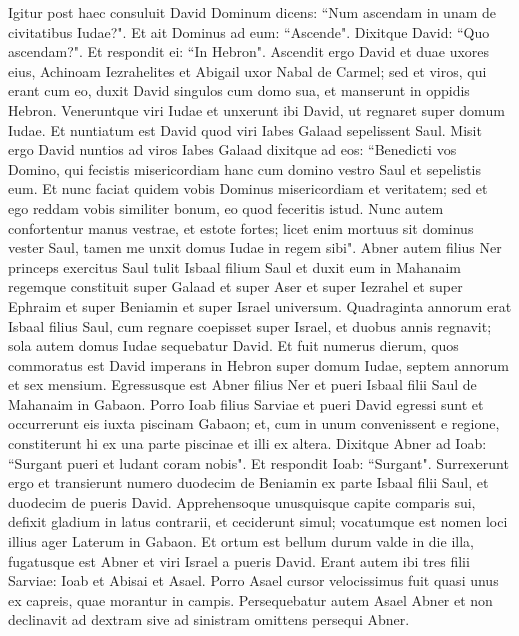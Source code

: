 \begin{biblechapter}  
\verse Igitur post haec consuluit David Dominum dicens: “Num ascendam in unam de civitatibus Iudae?". Et ait Dominus ad eum: “Ascende". Dixitque David: “Quo ascendam?". Et respondit ei: “In Hebron". 
\verse Ascendit ergo David et duae uxores eius, Achinoam Iezrahelites et Abigail uxor Nabal de Carmel; 
\verse sed et viros, qui erant cum eo, duxit David singulos cum domo sua, et manserunt in oppidis Hebron. 
\verse Veneruntque viri Iudae et unxerunt ibi David, ut regnaret super domum Iudae. Et nuntiatum est David quod viri Iabes Galaad sepelissent Saul. 
\verse Misit ergo David nuntios ad viros Iabes Galaad dixitque ad eos: “Benedicti vos Domino, qui fecistis misericordiam hanc cum domino vestro Saul et sepelistis eum. 
\verse Et nunc faciat quidem vobis Dominus misericordiam et veritatem; sed et ego reddam vobis similiter bonum, eo quod feceritis istud. 
\verse Nunc autem confortentur manus vestrae, et estote fortes; licet enim mortuus sit dominus vester Saul, tamen me unxit domus Iudae in regem sibi". 
\verse Abner autem filius Ner princeps exercitus Saul tulit Isbaal filium Saul et duxit eum in Mahanaim 
\verse regemque constituit super Galaad et super Aser et super Iezrahel et super Ephraim et super Beniamin et super Israel universum.  
\verse Quadraginta annorum erat Isbaal filius Saul, cum regnare coepisset super Israel, et duobus annis regnavit; sola autem domus Iudae sequebatur David.  
\verse Et fuit numerus dierum, quos commoratus est David imperans in Hebron super domum Iudae, septem annorum et sex mensium. 
\verse Egressusque est Abner filius Ner et pueri Isbaal filii Saul de Mahanaim in Gabaon. 
\verse Porro Ioab filius Sarviae et pueri David egressi sunt et occurrerunt eis iuxta piscinam Gabaon; et, cum in unum convenissent e regione, constiterunt hi ex una parte piscinae et illi ex altera. 
\verse Dixitque Abner ad Ioab: “Surgant pueri et ludant coram nobis". Et respondit Ioab: “Surgant". 
\verse Surrexerunt ergo et transierunt numero duodecim de Beniamin ex parte Isbaal filii Saul, et duodecim de pueris David. 
\verse Apprehensoque unusquisque capite comparis sui, defixit gladium in latus contrarii, et ceciderunt simul; vocatumque est nomen loci illius ager Laterum in Gabaon. 
\verse Et ortum est bellum durum valde in die illa, fugatusque est Abner et viri Israel a pueris David. 
\verse Erant autem ibi tres filii Sarviae: Ioab et Abisai et Asael. Porro Asael cursor velocissimus fuit quasi unus ex capreis, quae morantur in campis. 
\verse Persequebatur autem Asael Abner et non declinavit ad dextram sive ad sinistram omittens persequi Abner. 

\end{biblechapter}
